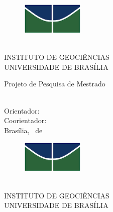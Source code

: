 \thispagestyle{empty}
\begin{figure}[h!]
	\flushright
	\includegraphics[width=3cm]{Config/unb.png}
\end{figure}
\begin{center}
	\large
	\MakeUppercase{
		\programanome \\
		Instituto de Geociências \\
		Universidade de Brasília
	}
\end{center}

\vspace{4cm}

\begin{center}
	\Large
	Projeto de Pesquisa de Mestrado \\
	\textbf{\MakeUppercase \titulonome}
\end{center}

\vspace{3.5cm}

\begin{center}
	\large
	\candidatonome \\
	Orientador: \orientadornome \\
	Coorientador: \coorientadornome \\
	\vspace{1.0cm}
	Brasília, \mesnome ~de \anonome
\end{center}
\clearpage

\thispagestyle{empty}
\begin{figure}[h!]
	\flushright
	\includegraphics[width=3cm]{Config/unb.png}
\end{figure}

\begin{center}
	\large
	\MakeUppercase{
		\programanome \\
		Instituto de Geociências \\
		Universidade de Brasília
	}
\end{center}	

\vspace{1cm}	

